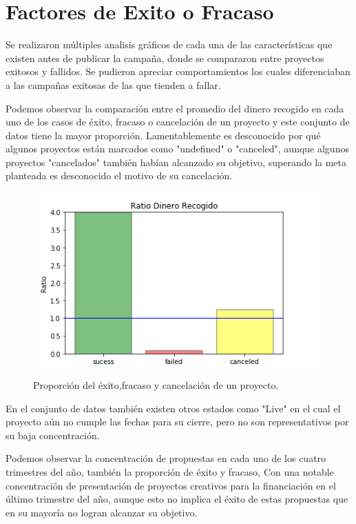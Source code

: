 \documentclass[journal]{IEEEtran}
\begin{document}
\section{Factores de Exito o Fracaso}
Se realizaron múltiples analisis gráficos de cada una de las características que existen antes de publicar la campaña, donde se compararon entre proyectos exitosos y fallidos. Se pudieron apreciar comportamientos los cuales diferenciaban a las campañas exitosas de las que tienden a fallar.


Podemos observar la comparación entre el promedio del dinero recogido en cada uno de los casos de éxito, fracaso o cancelación de un proyecto y este conjunto de datos tiene la mayor proporción.
Lamentablemente es desconocido por qué algunos proyectos están marcados como "undefined" o "canceled", aunque algunos proyectos "cancelados" también habían alcanzado su objetivo, superando la meta planteada es desconocido el motivo de su cancelación.


\begin{figure}[H]
    \centering
    \captionsetup{justification=centering}
\includegraphics[width=\linewidth]{Images/RatioDinero.png}
    \caption{Proporción del éxito,fracaso y cancelación de un proyecto. }
\end{figure}

En el conjunto de datos también existen otros estados como "Live" en el cual el proyecto aún no cumple las fechas para su cierre, pero no son representativos por su baja concentración.


Podemos observar la concentración de propuestas  en cada uno de los cuatro trimestres del año, también la proporción de éxito y fracaso, Con una notable concentración de presentación de proyectos creativos  para la financiación en el último trimestre del año, aunque esto no implica el éxito de estas propuestas que en su mayoría no logran alcanzar su objetivo.
\end{document}
